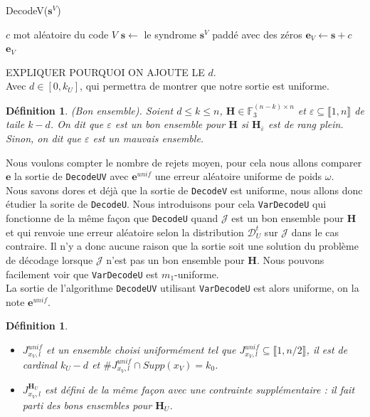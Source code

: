 \documentclass[12pt]{article}
\theoremstyle{plain}
\newtheorem{defi}[thm]{Définition}
\newcommand{\F}{\mathbb{F}}
\newcommand{\e}{\mathbf{e}}
\newcommand{\s}{\mathbf{s}}
\newcommand{\J}{\mathcal{J}}
\newcommand{\D}{\mathcal{D}}
\begin{document}
\begin{algorithm}
	\caption{DecodeV($\s^V$)}
	\begin{algorithmic}[1]
    	\STATE $c$ mot aléatoire du code $V$
    	\STATE $\s \leftarrow$ le syndrome $\s^V$ paddé avec des zéros
    	\STATE $\e_V \leftarrow \s + c$
    	\RETURN $\e_V$
    \end{algorithmic}
\end{algorithm}

EXPLIQUER POURQUOI ON AJOUTE LE $d$.\\
Avec $d\in [0,k_U]$, qui permettra de montrer que notre sortie est uniforme.

\begin{defi} (Bon ensemble).
Soient $d \leq k \leq n$, $\mathbf{H}\in\F_3^{(n-k)\times n}$ et $\varepsilon \subseteq \llbracket1,n\rrbracket$ de taile $k-d$. On dit que $\varepsilon$ est un bon ensemble pour $\mathbf{H}$ si $\mathbf{H}_{\overline{\varepsilon}}$ est de rang plein. Sinon, on dit que $\varepsilon$ est un mauvais ensemble.
\end{defi}


\noindent Nous voulons compter le nombre de rejets moyen, pour cela nous allons comparer $\e$ la sortie de \verb|DecodeUV| avec $\e^{unif}$ une erreur aléatoire uniforme de poids $\omega$.\\
Nous savons dores et déjà que la sortie de \verb|DecodeV| est uniforme, nous allons donc étudier la sorite de \verb|DecodeU|.
Nous introduisons pour cela \verb|VarDecodeU| qui fonctionne de la même façon que \verb|DecodeU| quand $\J$ est un bon ensemble pour $\mathbf{H}$ et qui renvoie une erreur aléatoire selon la distribution $\D_U^t$ sur $\J$ dans le cas contraire.
Il n'y a donc aucune raison que la sortie soit une solution du problème de décodage lorsque $\J$ n'est pas un bon ensemble pour $\mathbf{H}$.
Nous pouvons facilement voir que \verb|VarDecodeU| est $m_1$-uniforme.\\
La sortie de l'algorithme \verb|DecodeUV| utilisant \verb|VarDecodeU| est alors uniforme, on la note $\e^{unif}$.\\

\begin{defi}\
\begin{itemize}
\item $J_{x_V,l}^{unif}$ et un ensemble choisi uniformément tel que $J_{x_V,l}^{unif}\subseteq \llbracket 1,n/2 \rrbracket$, il est de cardinal $k_U-d$ et $\#J_{x_V,l}^{unif}\cap Supp(x_V) = k_0$. 
\item $J_{x_V, l}^{\mathbf{H}_U}$ est défini de la même façon avec une contrainte supplémentaire : il fait parti des bons ensembles pour $\mathbf{H}_U$.
\end{itemize}
\end{defi}
\end{document}
